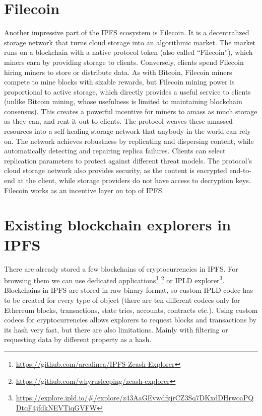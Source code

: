 \section{Filecoin}
Another impressive part of the IPFS ecosystem is Filecoin. It is a decentralized storage network that turns cloud storage into an algorithmic market. The market runs on a blockchain with a native protocol token (also called ``Filecoin''), which miners earn by providing storage to clients. Conversely, clients spend Filecoin hiring miners to store or distribute data. As with Bitcoin, Filecoin miners compete to mine blocks with sizable rewards, but Filecoin mining power is proportional to active storage, which directly provides a useful service to clients (unlike Bitcoin mining, whose usefulness is limited to maintaining blockchain consensus). This creates a powerful incentive for miners to amass as much storage as they can, and rent it out to clients. The protocol weaves these amassed resources into a self-healing storage network that anybody in the world can rely on. The network achieves robustness by replicating and dispersing content, while automatically detecting and repairing replica failures. Clients can select replication parameters to protect against different threat models. The protocol’s cloud storage network also provides security, as the content is encrypted end-to-end at the client, while storage providers do not have access to decryption keys. Filecoin works as an incentive layer on top of IPFS.\cite{filecoinWhitepaper}

\section{Existing blockchain explorers in IPFS}
There are already stored a few blockchains of cryptocurrencies in IPFS. For browsing them we can use dedicated applications\footnote{\url{https://github.com/arcalinea/IPFS-Zcash-Explorer}} \footnote{\url{https://github.com/whyrusleeping/zcash-explorer}} or IPLD explorer\footnote{\url{https://explore.ipld.io/\#/explore/z43AaGEvwdfzjrCZ3Sq7DKxdDHrwoaPQDtqF4jfdkNEVTiqGVFW}}. Blockchains in IPFS are stored in raw binary format, so custom IPLD codec has to be created for every type of object (there are ten different codecs only for Ethereum blocks, transactions, state tries, accounts, contracts etc.). Using custom codecs for cryptocurrencies allows explorers to request blocks and transactions by its hash very fast, but there are also limitations. Mainly with filtering or requesting data by different property as a hash.

